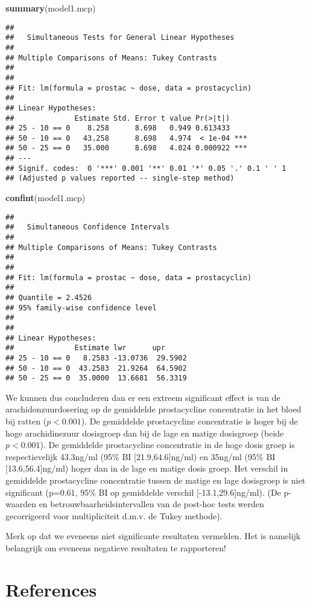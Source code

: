 \documentclass[
  12pt,dutch,coursenotes]{book}
\newenvironment{Shaded}{\begin{snugshade}}{\end{snugshade}}
\newcommand{\KeywordTok}[1]{\textcolor[rgb]{0.13,0.29,0.53}{\textbf{#1}}}
\newcommand{\NormalTok}[1]{#1}
\theoremstyle{definition}
\theoremstyle{definition}
\theoremstyle{definition}
\theoremstyle{remark}
\begin{document}
\begin{Shaded}
\begin{Highlighting}[]
\KeywordTok{summary}\NormalTok{(model1.mcp)}
\end{Highlighting}
\end{Shaded}

\begin{verbatim}
## 
##   Simultaneous Tests for General Linear Hypotheses
## 
## Multiple Comparisons of Means: Tukey Contrasts
## 
## 
## Fit: lm(formula = prostac ~ dose, data = prostacyclin)
## 
## Linear Hypotheses:
##              Estimate Std. Error t value Pr(>|t|)    
## 25 - 10 == 0    8.258      8.698   0.949 0.613433    
## 50 - 10 == 0   43.258      8.698   4.974  < 1e-04 ***
## 50 - 25 == 0   35.000      8.698   4.024 0.000922 ***
## ---
## Signif. codes:  0 '***' 0.001 '**' 0.01 '*' 0.05 '.' 0.1 ' ' 1
## (Adjusted p values reported -- single-step method)
\end{verbatim}

\begin{Shaded}
\begin{Highlighting}[]
\KeywordTok{confint}\NormalTok{(model1.mcp)}
\end{Highlighting}
\end{Shaded}

\begin{verbatim}
## 
##   Simultaneous Confidence Intervals
## 
## Multiple Comparisons of Means: Tukey Contrasts
## 
## 
## Fit: lm(formula = prostac ~ dose, data = prostacyclin)
## 
## Quantile = 2.4526
## 95% family-wise confidence level
##  
## 
## Linear Hypotheses:
##              Estimate lwr      upr     
## 25 - 10 == 0   8.2583 -13.0736  29.5902
## 50 - 10 == 0  43.2583  21.9264  64.5902
## 50 - 25 == 0  35.0000  13.6681  56.3319
\end{verbatim}

We kunnen dus concluderen dan er een extreem significant effect is van de arachidonzuurdosering op de gemiddelde prostacycline concentratie in het bloed bij ratten (\(p<0.001\)).
De gemiddelde prostacycline concentratie is hoger bij de hoge arachidinezuur dosisgroep dan bij de lage en matige dosisgroep (beide \(p<0.001\)).
De gemiddelde prostacycline concentratie in de hoge dosis groep is respectievelijk 43.3ng/ml (95\% BI {[}21.9,64.6{]}ng/ml) en 35ng/ml (95\% BI {[}13.6,56.4{]}ng/ml) hoger dan in de lage en matige dosis groep.
Het verschil in gemiddelde prostacycline concentratie tussen de matige en lage dosisgroep is niet significant (p=0.61, 95\% BI op gemiddelde verschil {[}-13.1,29.6{]}ng/ml).
(De p-waarden en betrouwbaarheidsintervallen van de post-hoc tests werden gecorrigeerd voor multipliciteit d.m.v. de Tukey methode).

Merk op dat we eveneens niet significante resultaten vermelden. Het is namelijk belangrijk om eveneens negatieve resultaten te rapporteren!

\hypertarget{references}{%
\chapter{References}\label{references}}

  
\end{document}
